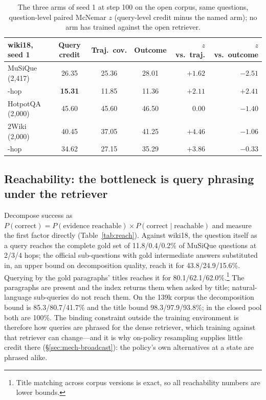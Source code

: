 \begin{table}[t]
\centering
\small
\begin{tabular}{lcccrr}
\toprule
wiki18, seed 1 & Query credit & Traj.\ cov. & Outcome & $z$ vs.\ traj. & $z$ vs.\ outcome \\
\midrule
MuSiQue (2{,}417)  & 26.35 & 25.36 & 28.01 & $+1.62$ & $-2.51$ \\
\quad 4-hop        & \textbf{15.31} & 11.85 & 11.36 & $+2.11$ & $+2.41$ \\
HotpotQA (2{,}000) & 45.60 & 45.60 & 46.50 & $0.00$ & $-1.40$ \\
2Wiki (2{,}000)    & 40.45 & 37.05 & 41.25 & $+4.46$ & $-1.06$ \\
\quad 4-hop        & 34.62 & 27.15 & 35.29 & $+3.86$ & $-0.33$ \\
\bottomrule
\end{tabular}
\caption{The three arms of seed 1 at step 100 on the open corpus, same
questions, question-level paired McNemar $z$ (query-level credit minus
the named arm); no arm has trained against the open retriever.}
\label{tab:open-qc}
\end{table}

\subsection{Reachability: the bottleneck is query phrasing under the retriever}
\label{sec:transfer-reach}

Decompose success as
$P(\text{correct}) = P(\text{evidence reachable}) \times
P(\text{correct}\mid\text{reachable})$ and measure the first factor
directly (Table~\ref{tab:reach}). Against wiki18, the question itself
as a query reaches the complete gold set of 11.8/0.4/0.2\% of
MuSiQue questions at 2/3/4 hops; the official sub-questions with gold
intermediate answers substituted in, an upper bound on decomposition
quality, reach it for 43.8/24.9/15.6\%. Querying by the gold
paragraphs' titles reaches it for 80.1/62.1/62.0\%.\footnote{Title
matching across corpus versions is exact, so all reachability numbers
are lower bounds.} The paragraphs are present and the index returns
them when asked by title; natural-language sub-queries do not reach
them. On the 139k corpus the decomposition bound is 85.3/80.7/41.7\%
and the title bound 98.3/97.9/93.8\%; in the closed pool both are
100\%. The binding constraint outside the training environment is
therefore how queries are phrased for the dense retriever, which
training against that retriever can change---and it is why on-policy
resampling supplies little credit there (\S\ref{sec:mech-broadcast}):
the policy's own alternatives at a state are phrased alike.

